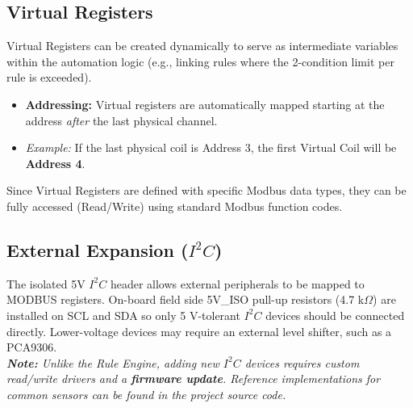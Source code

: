\documentclass[10pt]{datasheet}
\begin{document}
\subsection{Virtual Registers}
Virtual Registers can be created dynamically to serve as intermediate variables within the automation logic (e.g., linking rules where the 2-condition limit per rule is exceeded).
\begin{itemize}
    \item \textbf{Addressing:} Virtual registers are automatically mapped starting at the address \textit{after} the last physical channel.
    \item \textit{Example:} If the last physical coil is Address 3, the first Virtual Coil will be \textbf{Address 4}.
\end{itemize}

Since Virtual Registers are defined with specific Modbus data types, they can be fully accessed (Read/Write) using standard Modbus function codes.

\clearpage

\subsection{External Expansion ($I^2C$)}
The isolated 5V $I^2C$ header allows external peripherals to be mapped to MODBUS registers. On-board field side 5V\_ISO pull-up resistors (4.7 k$\Omega$) are installed on SCL and SDA so only 5 V-tolerant $I^2C$ devices should be connected directly. Lower-voltage devices may require an external level shifter, such as a PCA9306.
\vspace{1em} \\
\textit{\textbf{Note:} Unlike the Rule Engine, adding new $I^2C$ devices requires custom read/write drivers and a \textbf{firmware update}. Reference implementations for common sensors can be found in the project source code.}
\end{document}
